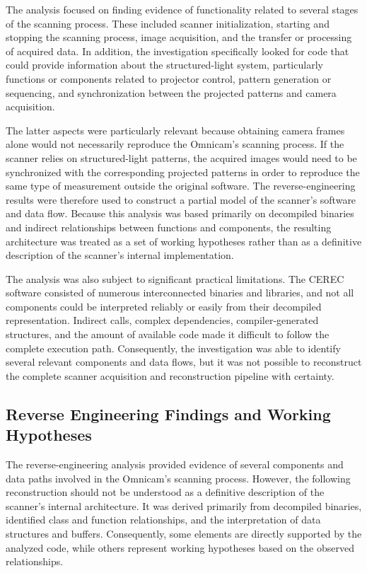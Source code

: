 The analysis focused on finding evidence of functionality related to several stages of the scanning process. These included scanner initialization, starting and stopping the scanning process, image acquisition, and the transfer or processing of acquired data. In addition, the investigation specifically looked for code that could provide information about the structured-light system, particularly functions or components related to projector control, pattern generation or sequencing, and synchronization between the projected patterns and camera acquisition.

The latter aspects were particularly relevant because obtaining camera frames alone would not necessarily reproduce the Omnicam's scanning process. If the scanner relies on structured-light patterns, the acquired images would need to be synchronized with the corresponding projected patterns in order to reproduce the same type of measurement outside the original software. The reverse-engineering results were therefore used to construct a partial model of the scanner's software and data flow. Because this analysis was based primarily on decompiled binaries and indirect relationships between functions and components, the resulting architecture was treated as a set of working hypotheses rather than as a definitive description of the scanner's internal implementation. 

The analysis was also subject to significant practical limitations. The CEREC software consisted of numerous interconnected binaries and libraries, and not all components could be interpreted reliably or easily from their decompiled representation. Indirect calls, complex dependencies, compiler-generated structures, and the amount of available code made it difficult to follow the complete execution path. Consequently, the investigation was able to identify several relevant components and data flows, but it was not possible to reconstruct the complete scanner acquisition and reconstruction pipeline with certainty.

\subsection{Reverse Engineering Findings and Working Hypotheses}

The reverse-engineering analysis provided evidence of several components and data paths involved in the Omnicam's scanning process. However, the following reconstruction should not be understood as a definitive description of the scanner's internal architecture. It was derived primarily from decompiled binaries, identified class and function relationships, and the interpretation of data structures and buffers. Consequently, some elements are directly supported by the analyzed code, while others represent working hypotheses based on the observed relationships.

